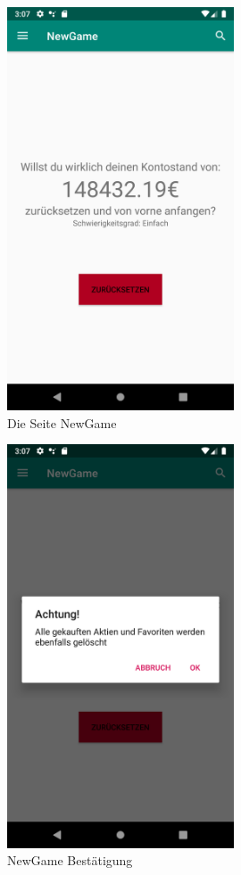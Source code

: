 \documentclass[10pt]{scrartcl}
\begin{document}
\begin{figure}[H]
	\centering
	\includegraphics[width=0.6\textwidth]{Bilder/Applikation/NewGame.png}
	\caption{Die Seite NewGame}
\end{figure}

\begin{figure}[H]
	\centering
	\includegraphics[width=0.6\textwidth]{Bilder/Applikation/NewGameBestaetigung.png}
	\caption{NewGame Bestätigung}
\end{figure}
\end{document}
